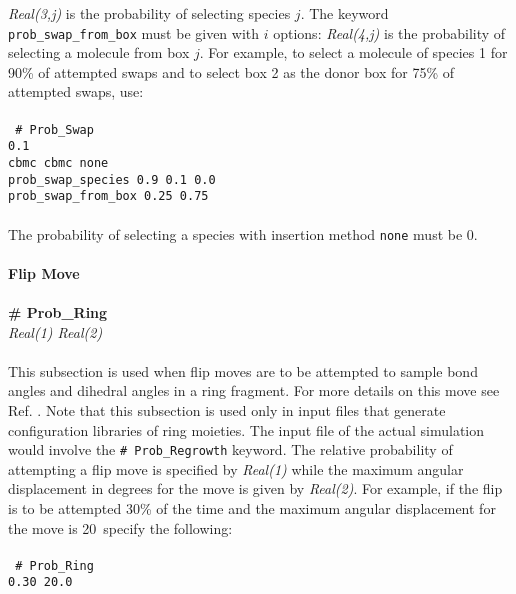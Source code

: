{\it Real(3,j)} is the probability of selecting species $j$.
The keyword {\tt prob\_swap\_from\_box} must be given with $i$ options:
{\it Real(4,j)} is the probability of selecting a molecule from box $j$.
For example, to select a molecule of species 1 for 90\% of attempted swaps and 
to select box 2 as the donor box for 75\% of attempted swaps, use: \\ \\
%
\texttt{ \# Prob\_Swap\\
0.1 \\ 
cbmc cbmc none \\
prob\_swap\_species 0.9 0.1 0.0 \\
prob\_swap\_from\_box 0.25 0.75 \\ \\ }
%
The probability of selecting a species with insertion method \texttt{none} must be 0. \\ \\
%
%
%
{\bf Flip Move}\\ \\
{\bf \# Prob\_Ring} \\
{\it Real(1) Real(2)} \\ \\
%
This subsection is used when flip moves are to be attempted to sample bond angles and 
dihedral angles in a ring fragment. 
For more details on this move see Ref. \cite{Shah:2011}. 
Note that this subsection is used only in input files
that generate configuration libraries of ring moieties. The input file of the 
actual simulation would involve the \texttt{\# Prob\_Regrowth} keyword.
The relative probability of attempting a flip move is 
specified by {\it Real(1)} while the maximum angular displacement 
in degrees for the move is given by {\it Real(2)}. 
For example, if the flip is to be attempted 30\% of the 
time and the maximum angular displacement for the 
move is 20\degree~specify the following: \\ \\
%
\texttt{
\# Prob\_Ring \\
0.30 20.0 \\ \\}
%
%
